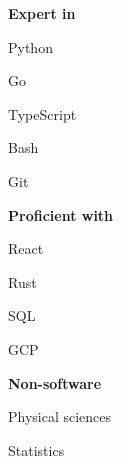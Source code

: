 \documentclass[]{resume}
\begin{document}
\begin{minipage}[t]{0.33\textwidth}
\textbf{Expert in}
\vspace{\topsep} %
\begin{tightemize}
\item Python
\item Go
\item TypeScript
\item Bash
\item Git
\end{tightemize}
\sectionsep

\textbf{Proficient with}
\begin{tightemize}
\item React
\item Rust
\item SQL
\item GCP
\end{tightemize}
\sectionsep

\textbf{Non-software}
\begin{tightemize}
\item Physical sciences
\item Statistics
\end{tightemize}
\sectionsep


\end{minipage}
\hfill
\end{document}
